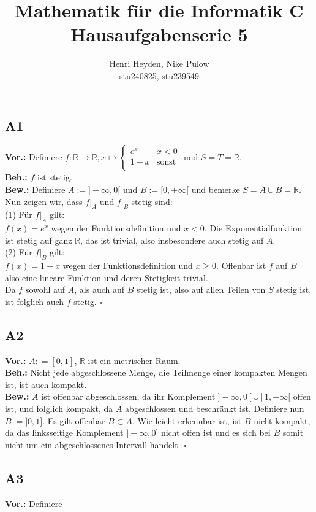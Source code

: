 \documentclass[12pt, a4paper]{article}
\title{Mathematik für die Informatik C\\Hausaufgabenserie 5}
\author{Henri Heyden, Nike Pulow \\ \small stu240825, stu239549}
\date{}
\newcommand*{\qed}{\null\nobreak\hfill\ensuremath{\square}}
\newcommand*{\gap}{\text{ }}
\newcommand*{\vor}{\textbf{Vor.:} \gap}
\newcommand*{\beh}{\textbf{Beh.:} \gap}
\newcommand*{\bew}{\textbf{Bew.:} \gap}
\begin{document}
\maketitle

\doublespacing

\subsection*{A1}
\vor Definiere \(f : \mathbb{R} \rightarrow \mathbb{R}, x \mapsto
\begin{cases}
    e^x & x < 0\\
    1-x & \text{sonst}\\
\end{cases}\)  und \(S=T=\mathbb{R}\).\\
\beh \(f\) ist stetig.\\
\bew Definiere \(A:=]- \infty, 0 [\) und \(B := [0,+ \infty[\) und bemerke \(S=A \cup B = \mathbb{R}\). 
Nun zeigen wir, dass \(f |_A\) und \(f |_B\) stetig sind:\\
(1) Für \(f |_A\) gilt: \\
\(f(x) = e^x\) wegen der Funktionsdefinition und \(x<0\). Die Exponentialfunktion ist stetig auf 
ganz \(\mathbb{R}\), das ist trivial, also insbesondere auch stetig auf \(A\).\\
(2) Für \(f|_B\) gilt: \\
\(f(x) = 1-x\) wegen der Funktionsdefinition und \(x \geq 0\). Offenbar ist \(f\) auf \(B\) also 
eine lineare Funktion und deren Stetigkeit trivial.\\
Da \(f\) sowohl auf \(A\), als auch auf \(B\) stetig ist, also auf allen Teilen von \(S\) 
stetig ist, ist folglich auch \(f\) stetig. \qed

\subsection*{A2}
\vor \(A : = [0,1]\), \(\mathbb{R}\) ist ein metrischer Raum.\\
\beh Nicht jede abgeschlossene Menge, die Teilmenge einer kompakten Mengen ist, ist auch kompakt.\\
\bew \(A\) ist offenbar abgeschlossen, da ihr Komplement \(]-\infty,0[\cup]1,+\infty[\) offen ist, 
und folglich kompakt, da \(A\) abgeschlossen und beschränkt ist. Definiere nun \(B:=]0,1]\). Es gilt 
offenbar \(B \subset A\). Wie leicht erkennbar ist, ist \(B\) nicht kompakt, da das linksseitige 
Komplement \(]-\infty,0]\) nicht offen ist und es sich bei \(B\) somit nicht um ein 
abgeschlossenes Intervall handelt. \qed

\subsection*{A3}
\vor Definiere \(\)
\end{document}
